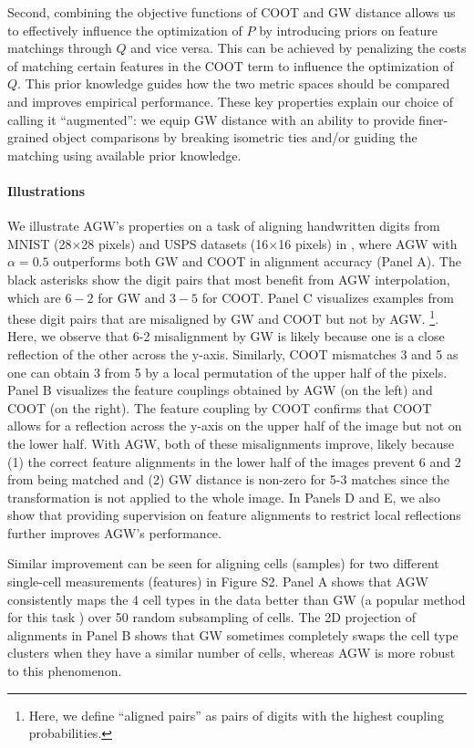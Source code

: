 Second, combining the objective functions of COOT and GW distance allows us to
effectively influence the optimization of $P$ by introducing priors on feature matchings
through $Q$ and vice versa. This can be achieved by penalizing the costs of matching
certain features in the COOT term to influence the optimization of $Q$. This prior knowledge
guides how the two metric spaces should be compared and improves empirical performance.
These key properties explain our choice of calling it ``augmented'':
we equip GW distance with an ability to provide finer-grained object comparisons by
breaking isometric ties and/or guiding the matching using available prior knowledge.

\paragraph{Illustrations} We illustrate AGW's properties on a task of aligning handwritten digits
from MNIST \citep{lecun10} (28$\times$28 pixels) and USPS datasets (16$\times$16 pixels)
\citep{Hull94} in , where AGW with $\alpha=0.5$ outperforms both GW and COOT
in alignment accuracy (Panel A). The black asterisks show the digit pairs that most benefit
from AGW interpolation, which are $6-2$ for GW and $3-5$ for COOT.
Panel C visualizes examples from these digit pairs that are misaligned by GW and COOT
but not by AGW.
\footnote{Here, we define ``aligned pairs'' as pairs of digits with the
highest coupling probabilities.}. Here, we observe that 6-2 misalignment by GW is likely because
one is a close reflection of the other across the y-axis. Similarly,
COOT mismatches 3 and 5 as one can obtain 3 from 5 by a local permutation of
the upper half of the pixels. Panel B visualizes the feature couplings obtained by
AGW (on the left) and COOT (on the right). The feature coupling by COOT confirms that
COOT allows for a reflection across the y-axis on the upper half of the image
but not on the lower half. With AGW, both of these misalignments improve,
likely because (1) the correct feature alignments in the lower half of the images
prevent 6 and 2 from being matched and (2) GW distance is non-zero for 5-3 matches
since the transformation is not applied to the whole image. In Panels D and E,
we also show that providing supervision on feature alignments to restrict local reflections
further improves AGW's performance.

Similar improvement can be seen for aligning cells (samples) for two different single-cell
measurements (features) \citep{SNAREseq} in Figure S2. Panel A shows that AGW consistently maps
the 4 cell types in the data better than GW (a popular method for this task
\citep{Pamona,Demetci20,Demetci22,UniPort}) over 50 random subsampling of cells.
The 2D projection of alignments in Panel B shows that GW sometimes completely swaps
the cell type clusters when they have a similar number of cells, whereas AGW is more robust
to this phenomenon.

